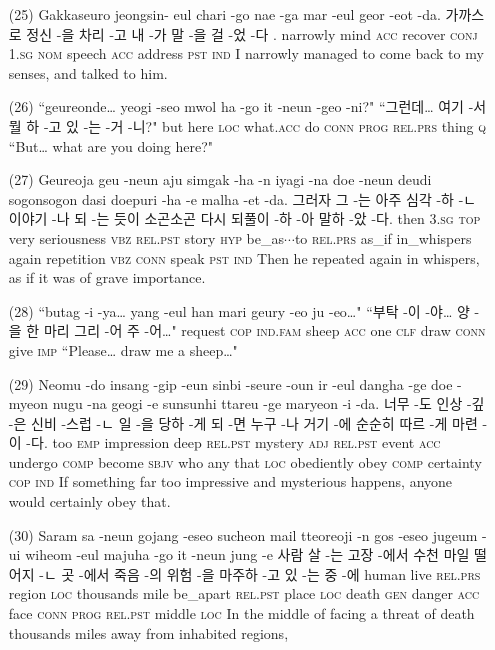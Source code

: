 \begin{itemize}
\item [(25)]
\tgl
		{Gakkaseuro jeongsin- eul chari -go nae -ga mar -eul geor -eot -da.}
		{가까스로 정신 -을 차리 -고 내 -가 말 -을 걸 -었 -다 .}
		{narrowly	mind	\textsc{acc}	recover	\textsc{conj}	\textsc{1.sg}	\textsc{nom}	speech	\textsc{acc}	address	\textsc{pst}	\textsc{ind}}
		{I narrowly managed to come back to my senses, and talked to him.}
		
\item [(26)]
\tgl
		{``geureonde… yeogi -seo mwol ha -go it -neun -geo -ni?"}
		{``그런데… 여기 -서 뭘 하 -고 있 -는 -거 -니?"}
		{but	here	\textsc{loc}	what.\textsc{acc}	do	\textsc{conn}	\textsc{prog}	\textsc{rel.prs}	thing	\textsc{q}	}
		{``But… what are you doing here?"}
		
\item [(27)]
\tgl
		{Geureoja geu -neun aju simgak -ha -n iyagi -na doe -neun deudi sogonsogon dasi doepuri -ha -e malha -et -da.}
		{그러자 그 -는 아주 심각 -하 -ㄴ 이야기 -나 되 -는 듯이 소곤소곤 다시 되풀이 -하 -아 말하 -았 -다.}
		{then	\textsc{3.sg}	\textsc{top}	very	seriousness	\textsc{vbz}	\textsc{rel.pst}	story	\textsc{hyp}	be\_as$\cdots$to	\textsc{rel.prs}	as\_if	in\_whispers	again	repetition	\textsc{vbz}	\textsc{conn}	speak	\textsc{pst}	\textsc{ind}}
		{Then he repeated again in whispers, as if it was of grave importance.}
		
\item [(28)]
\tgl
		{``butag -i -ya… yang -eul han mari geury -eo ju -eo…"}
		{``부탁 -이 -야… 양 -을 한 마리 그리 -어 주 -어…"}
		{request	\textsc{cop}	\textsc{ind.fam}	sheep	\textsc{acc}	one	\textsc{clf}	draw	\textsc{conn}	give	\textsc{imp}}
		{``Please… draw me a sheep…"}
		
\item [(29)]
\tgl
		{Neomu -do insang -gip -eun sinbi -seure -oun ir -eul dangha -ge doe -myeon nugu -na geogi -e sunsunhi ttareu -ge maryeon -i -da.}
		{너무 -도 인상 -깊 -은 신비 -스럽 -ㄴ 일 -을 당하 -게 되 -면 누구 -나 거기 -에 순순히 따르 -게 마련 -이 -다.}
		{too	\textsc{emp}	impression	deep	\textsc{rel.pst}	mystery	\textsc{adj}	\textsc{rel.pst}	event	\textsc{acc}	undergo	\textsc{comp}	become	\textsc{sbjv}	who	any	that	\textsc{loc}	obediently	obey	\textsc{comp}	certainty	\textsc{cop}	\textsc{ind}}
		{If something far too impressive and mysterious happens, anyone would certainly obey that.}
		
\item [(30)]
\tgl
		{Saram sa -neun gojang -eseo sucheon mail tteoreoji -n gos -eseo jugeum -ui wiheom -eul majuha -go it -neun jung -e}
		{사람 살 -는 고장 -에서 수천 마일 떨어지 -ㄴ 곳 -에서 죽음 -의 위험 -을 마주하 -고 있 -는 중 -에}
		{human	live	\textsc{rel.prs}	region	\textsc{loc}	thousands	mile	be\_apart	\textsc{rel.pst}	place	\textsc{loc}	death	\textsc{gen}	danger	\textsc{acc}	face	\textsc{conn}	\textsc{prog}	\textsc{rel.pst}	middle	\textsc{loc}}
		{In the middle of facing a threat of death thousands miles away from inhabited regions,}


\end{itemize}
